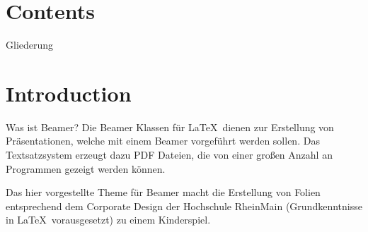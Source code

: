 


\maketitle


\section*{Contents}
\begin{frame}{Gliederung}
	\tableofcontents[hideallsubsections]
\end{frame}

\section{Introduction}

\begin{frame}{Was ist Beamer?}
	Die Beamer Klassen für \LaTeX\ dienen zur Erstellung von Präsentationen, welche mit einem Beamer vorgeführt werden sollen. Das Textsatzsystem erzeugt dazu PDF Dateien, die von einer großen Anzahl an Programmen gezeigt werden können.
	
	Das hier vorgestellte Theme für Beamer macht die Erstellung von Folien entsprechend dem Corporate Design der Hochschule {\Medium RheinMain} (Grundkenntnisse in \LaTeX\ vorausgesetzt) zu einem Kinderspiel.
\end{frame}

